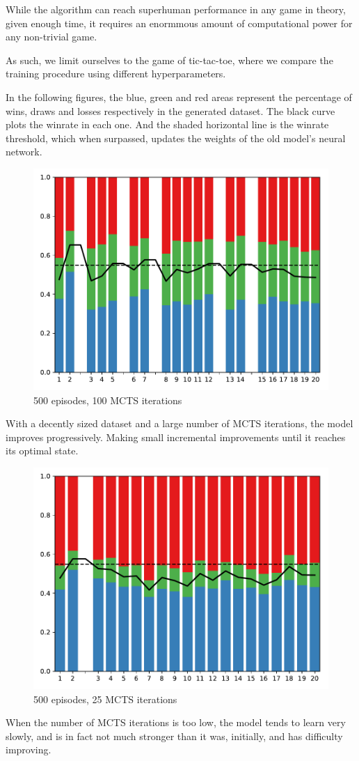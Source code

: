 \documentclass[12pt]{article}
\begin{document}
While the algorithm can reach superhuman performance in any game in theory,
given enough time, it requires an enormmous amount of computational power
for any non-trivial game.

As such, we limit ourselves to the game of tic-tac-toe, where we compare
the training procedure using different hyperparameters.

In the following figures, the blue, green and red areas represent the
percentage of wins, draws and losses respectively in the generated dataset.
The black curve plots the winrate in each one. And the shaded horizontal
line is the winrate threshold, which when surpassed, updates the weights
of the old model's neural network.

\begin{figure}[h!]
    \centering
    \includegraphics[width=.5\textwidth]{plots/0.pdf}
    \caption{500 episodes, 100 MCTS iterations}
\end{figure}

With a decently sized dataset and a large number of MCTS iterations, the model
improves progressively. Making small incremental improvements until it reaches
its optimal state.

\begin{figure}[h!]
    \centering
    \includegraphics[width=.5\textwidth]{plots/2.pdf}
    \caption{500 episodes, 25 MCTS iterations}
\end{figure}

When the number of MCTS iterations is too low, the model tends to learn very
slowly, and is in fact not much stronger than it was, initially, and has
difficulty improving.
\end{document}
